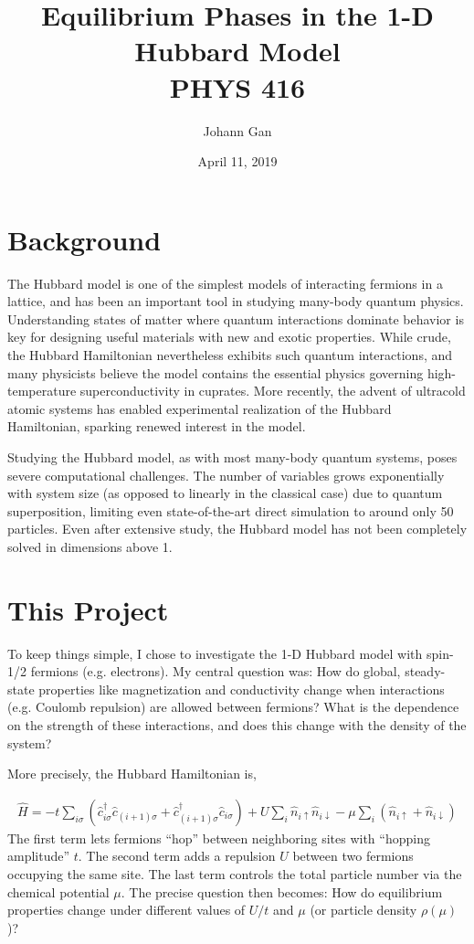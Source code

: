 \documentclass{article}
\title{%
	Equilibrium Phases in the 1-D Hubbard Model \\
	\large PHYS 416}
\author{Johann Gan}
\date{April 11, 2019}
\begin{document}
\maketitle

\section{Background}
The Hubbard model is one of the simplest models of interacting fermions in a lattice, and has been an important tool in studying many-body quantum physics. Understanding states of matter where quantum interactions dominate behavior is key for designing useful materials with new and exotic properties. While crude, the Hubbard Hamiltonian nevertheless exhibits such quantum interactions, and many physicists believe the model contains the essential physics governing high-temperature superconductivity in cuprates. More recently, the advent of ultracold atomic systems has enabled experimental realization of the Hubbard Hamiltonian, sparking renewed interest in the model.

Studying the Hubbard model, as with most many-body quantum systems, poses severe computational challenges. The number of variables grows exponentially with system size (as opposed to linearly in the classical case) due to quantum superposition, limiting even state-of-the-art direct simulation to around only 50 particles. Even after extensive study, the Hubbard model has not been completely solved in dimensions above 1.

\section{This Project}
To keep things simple, I chose to investigate the 1-D Hubbard model with spin-1/2 fermions (e.g. electrons). My central question was: How do global, steady-state properties like magnetization and conductivity change when interactions (e.g. Coulomb repulsion) are allowed between fermions? What is the dependence on the strength of these interactions, and does this change with the density of the system?

More precisely, the Hubbard Hamiltonian is,

\begin{align*}
\hat H = -t\sum_{i\sigma}\left(\hat c_{i\sigma}^\dag\hat c_{(i+1)\sigma} + \hat c_{(i+1)\sigma}^\dag\hat c_{i\sigma}\right) + U\sum_i\hat n_{i\uparrow}\hat n_{i\downarrow} - \mu\sum_i\left(\hat n_{i\uparrow} + \hat n_{i\downarrow}\right)
\end{align*}
The first term lets fermions ``hop'' between neighboring sites with ``hopping amplitude'' $t$. The second term adds a repulsion $U$ between two fermions occupying the same site. The last term controls the total particle number via the chemical potential $\mu$. The precise question then becomes: How do equilibrium properties change under different values of $U/t$ and $\mu$ (or particle density $\rho(\mu)$)?
\end{document}
